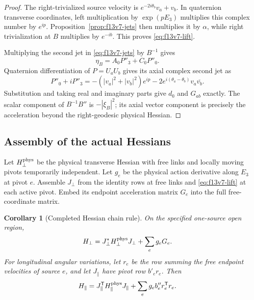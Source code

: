 \documentclass[11pt,oneside]{article}
\newtheorem{corollary}[theorem]{Corollary}
\begin{document}
\begin{proof}
The right-trivialized source velocity is
\(e^{-2i\theta_b}v_a+v_b\). In quaternion transverse
coordinates, left multiplication by
\(\exp(pE_3)\) multiplies this complex number
by \(e^{ip}\). Proposition~\ref{prop:f13v7-jets}
then multiplies it by \(\alpha\), while right
trivialization at \(B\) multiplies by \(e^{-ib}\).
This proves \eqref{eq:f13v7-lift}.

Multiplying the second jet in
\eqref{eq:f13v7-jets} by \(B^{-1}\) gives
\[
 \eta_B=A_0P''_3+C_0P''_0 .
\]
Quaternion differentiation of \(P=U_aU_b\)
gives its axial complex second jet as
\[
 P''_0+iP''_3
 =-(|v_a|^2+|v_b|^2)e^{ip}
       -2e^{i(\theta_a-\theta_b)}v_a\overline{v_b}.
\]
Substitution and taking real and imaginary
parts give \(d_0\) and \(G_{ab}\) exactly.
The scalar component of \(B^{-1}B''\) is
\(-|\xi_B|^2\); its axial vector component
is precisely the acceleration beyond the
right-geodesic physical Hessian.
\end{proof}

\subsection{Assembly of the actual Hessians}

Let \(H_\perp^{\rm phys}\) be the physical
transverse Hessian with free links and locally
moving pivots temporarily independent. Let
\(g_e\) be the physical action derivative
along \(E_3\) at pivot \(e\). Assemble \(J_\perp\)
from the identity rows at free links and
\eqref{eq:f13v7-lift} at each active pivot.
Embed its endpoint acceleration matrix \(G_e\)
into the full free-coordinate matrix.

\begin{corollary}[Completed Hessian chain rule]
\label{cor:f13v7-assembly}
On the specified one-source open region,
\begin{equation}\label{eq:f13v7-transverse}
 H_\perp
 =J_\perp^*H_\perp^{\rm phys}J_\perp
           +\sum_e g_eG_e .
\end{equation}
For longitudinal angular variations, let \(r_e\)
be the row summing the free endpoint velocities
of source \(e\), and let \(J_\parallel\) have
pivot row \(b'_er_e\). Then
\begin{equation}\label{eq:f13v7-scalar}
 H_\parallel
 =J_\parallel^{\mathsf T}H_\parallel^{\rm phys}
          J_\parallel+\sum_e g_eb''_er_e^{\mathsf T}r_e .
\end{equation}
\end{corollary}
\end{document}
